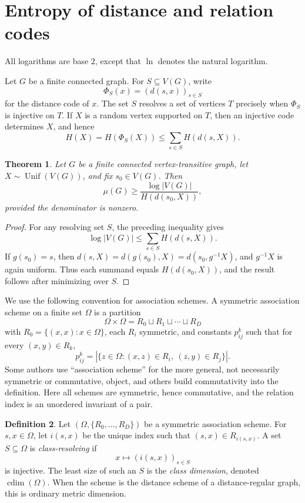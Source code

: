\documentclass[11pt]{article}
\newtheorem{theorem}{Theorem}[section]
\theoremstyle{definition}
\newtheorem{definition}[theorem]{Definition}
\theoremstyle{remark}
\newcommand{\cdim}{\operatorname{cdim}}
\newcommand{\Unif}{\operatorname{Unif}}
\begin{document}
\section{Entropy of distance and relation codes}\label{sec:entropy}

All logarithms are base \(2\), except that \(\ln\) denotes the natural 
logarithm.

Let \(G\) be a finite connected graph.  For \(S\subseteq V(G)\), write
\[
        \Phi_S(x)=(d(s,x))_{s\in S}
\]
for the distance code of \(x\).  The set \(S\) resolves a set of vertices 
\(T\) precisely when \(\Phi_S\) is injective on \(T\).  If \(X\) is a 
random vertex supported on \(T\), then an injective code determines \(X\), 
and hence
\[
        H(X)=H(\Phi_S(X))
        \leq
        \sum_{s\in S} H(d(s,X)).
\]

\begin{theorem}\label{thm:vt-entropy}
Let \(G\) be a finite connected vertex-transitive graph, let 
\(X\sim\Unif(V(G))\), and fix \(s_0\in V(G)\).  Then
\[
        \mu(G)
        \geq
        \frac{\log |V(G)|}{H(d(s_0,X))},
\]
provided the denominator is nonzero.
\end{theorem}

\begin{proof}
For any resolving set \(S\), the preceding inequality gives
\[
        \log |V(G)| \leq \sum_{s\in S} H(d(s,X)).
\]
If \(g(s_0)=s\), then \(d(s,X)=d(g(s_0),X)=d(s_0,g^{-1}X)\), and 
\(g^{-1}X\) is again uniform.  Thus each summand equals \(H(d(s_0,X))\), 
and the result follows after minimizing over \(S\).
\end{proof}

We use the following convention for association schemes.  A symmetric 
association scheme on a finite set \(\Omega\) is a partition
\[
        \Omega\times\Omega=R_0\sqcup R_1\sqcup\cdots\sqcup R_D
\]
with \(R_0=\{(x,x):x\in\Omega\}\), each \(R_i\) symmetric, and constants 
\(p_{ij}^k\) such that for every \((x,y)\in R_k\),
\[
        p_{ij}^k
        =
        |\{z\in\Omega:(x,z)\in R_i,\ (z,y)\in R_j\}|.
\]
Some authors use ``association scheme'' for the more general, not 
necessarily symmetric or commutative, object, and others build 
commutativity into the definition.  Here all schemes are symmetric, hence 
commutative, and the relation index is an unordered invariant of a pair.  

\begin{definition}\label{def:classdimension}
Let \((\Omega,\{R_0,\ldots,R_D\})\) be a symmetric association scheme.  
For \(s,x\in\Omega\), let \(i(s,x)\) be the unique index such that 
\((s,x)\in R_{i(s,x)}\).  A set \(S\subseteq\Omega\) is 
\emph{class-resolving} if
\[
        x\longmapsto (i(s,x))_{s\in S}
\]
is injective.  The least size of such an \(S\) is the \emph{class 
dimension}, denoted \(\cdim(\Omega)\).  When the scheme is the distance 
scheme of a distance-regular graph, this is ordinary metric dimension.
\end{definition}
\end{document}
